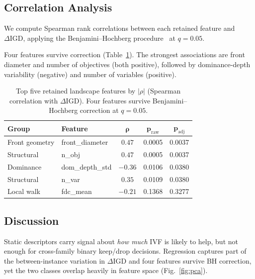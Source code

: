 \documentclass[conference]{IEEEtran}
\begin{document}
\subsection{Correlation Analysis}
\label{sec:fla_correlation}

We compute Spearman rank correlations between each retained feature and
$\Delta\mathrm{IGD}$, applying the Benjamini--Hochberg
procedure~\cite{benjamini1995controlling} at $q = 0.05$.

Four features survive correction (Table~\ref{tab:fla_top5}). The strongest
associations are front diameter and number of objectives (both positive),
followed by dominance-depth variability (negative) and number of variables
(positive).

\begin{table}[t]
	\centering
	\caption{Top five retained landscape features by $|\rho|$ (Spearman
		correlation with $\Delta\mathrm{IGD}$). Four features survive
		Benjamini--Hochberg correction at $q = 0.05$.}
	\label{tab:fla_top5}
	\begin{tabular}{llccc}
		\toprule
		\textbf{Group}                  & \textbf{Feature}                & $\boldsymbol{\rho}$ &
		$\boldsymbol{p_{\mathrm{raw}}}$ & $\boldsymbol{p_{\mathrm{adj}}}$                                         \\
		\midrule
		Front geometry                  & front\_diameter                 & $0.47$              & 0.0005 & 0.0037 \\
		Structural                      & n\_obj                          & $0.47$              & 0.0005 & 0.0037 \\
		Dominance                       & dom\_depth\_std                 & $-0.36$             & 0.0106 & 0.0380 \\
		Structural                      & n\_var                          & $0.35$              & 0.0109 & 0.0380 \\
		Local walk                      & fdc\_mean                       & $-0.21$             & 0.1368 & 0.3277 \\
		\bottomrule
	\end{tabular}
\end{table}

\subsection{Discussion}
\label{sec:fla_discussion}

Static descriptors carry signal about \emph{how much} IVF is likely to help,
but not enough for cross-family binary keep/drop decisions. Regression
captures part of the between-instance variation in $\Delta\mathrm{IGD}$ and
four features survive BH correction, yet the two classes overlap heavily in
feature space (Fig.~\ref{fig:pca}).
\end{document}
